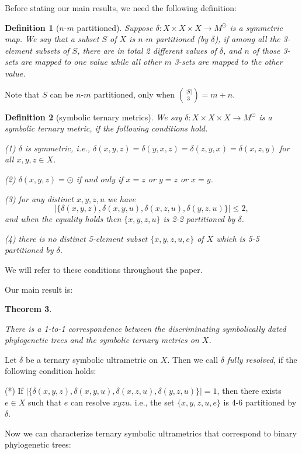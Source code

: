 \documentclass{article}
\newtheorem{theorem}{Theorem}
\newtheorem{defi}[theorem]{Definition}
\begin{document}
Before stating our main results, we need the following definition:
\begin{defi}[$n$-$m$ partitioned]
 Suppose $\delta: X\times X\times X\to M^{\odot}$ is a symmetric map. We say 
that a subset $S$ of $X$ is \textit{$n$-$m$ partitioned (by $\delta$)}, if
 among all the 3-element subsets of $S$, there are in 
total 2 different values of $\delta$,  
and $n$ of those 3-sets are mapped to one value while all other $m$ 3-sets 
are mapped to the other value.
\end{defi}
Note that $S$ can be $n$-$m$ partitioned, only when $\binom{|S|} { 3} = m+n$. 
\begin{defi}[symbolic ternary metrics]
We say $\delta:X\times X\times X\to M^{\odot}$ is a \textit{symbolic 
ternary metric}, if the following conditions hold.

(1) $\delta$ is symmetric, i.e., 
$\delta(x,y,z)=\delta(y,x,z)=\delta(z,y,x)=\delta(x,z,y)$ for all $x,y,z\in X$.

(2) $\delta(x,y,z)=\odot$ if and only if $x=z$ or $y=z$ or $x=y$.

(3) for any distinct $x,y,z,u$ we have 
$$|\{\delta(x,y,z),\delta(x,y,u),\delta(x,z,u),\delta(y,z,u)\}|\leq 2,$$
and when the equality holds then $\{x,y,z,u\}$ is 2-2 partitioned by $\delta$.


%  
(4) there is no distinct 5-element subset $\{x,y,z,u,e\}$ of $X$ which
is 5-5 partitioned by $\delta$.
 
\end{defi}

We will refer to these conditions throughout the paper. 

Our main result is:


\begin{theorem} \label{thm:ultra-ternary}

There is a 1-to-1 correspondence between the discriminating symbolically 
dated phylogenetic trees and 
the symbolic ternary metrics on $X$.
\end{theorem}

Let $\delta$ be a ternary symbolic ultrametric on $X$. Then we call 
$\delta$ {\em fully resolved}, if the following condition holds: 

(*) If $|\{\delta(x,y,z),\delta(x,y,u),\delta(x,z,u),\delta(y,z,u)\}|= 1$, then 
there exists $e\in X$ such that $e$ can resolve $xyzu$.
i.e., the set $\{x,y,z,u,e\}$ is 4-6 partitioned by $\delta$.


Now we can characterize ternary symbolic ultrametrics  that 
correspond to binary phylogenetic trees:  
\end{document}
